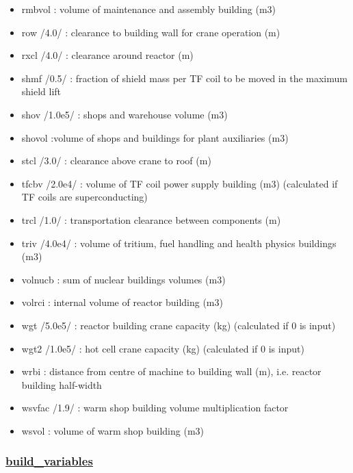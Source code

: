 \documentclass[
]{article}
\begin{document}
\begin{itemize}
\begin{itemize}
  \item
    rmbvol : volume of maintenance and assembly building (m3)
  \item
    row /4.0/ : clearance to building wall for crane operation (m)
  \item
    rxcl /4.0/ : clearance around reactor (m)
  \item
    shmf /0.5/ : fraction of shield mass per TF coil to be moved in the
    maximum shield lift
  \item
    shov /1.0e5/ : shops and warehouse volume (m3)
  \item
    shovol :volume of shops and buildings for plant auxiliaries (m3)
  \item
    stcl /3.0/ : clearance above crane to roof (m)
  \item
    tfcbv /2.0e4/ : volume of TF coil power supply building (m3)
    (calculated if TF coils are superconducting)
  \item
    trcl /1.0/ : transportation clearance between components (m)
  \item
    triv /4.0e4/ : volume of tritium, fuel handling and health physics
    buildings (m3)
  \item
    volnucb : sum of nuclear buildings volumes (m3)
  \item
    volrci : internal volume of reactor building (m3)
  \item
    wgt /5.0e5/ : reactor building crane capacity (kg) (calculated if 0
    is input)
  \item
    wgt2 /1.0e5/ : hot cell crane capacity (kg) (calculated if 0 is
    input)
  \item
    wrbi : distance from centre of machine to building wall (m), i.e.
    reactor building half-width
  \item
    wsvfac /1.9/ : warm shop building volume multiplication factor
  \item
    wsvol : volume of warm shop building (m3)
  \end{itemize}

  \hypertarget{build_variables}{%
  \subsubsection{\texorpdfstring{\href{build_variables.html}{build\_variables}}{build\_variables}}\label{build_variables}}


\end{itemize}
\end{document}
